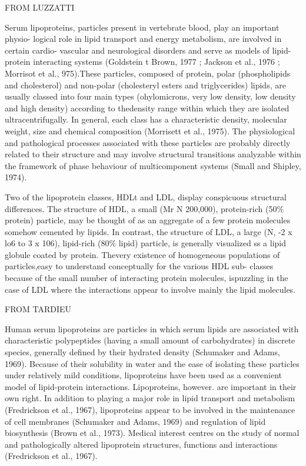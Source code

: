 FROM LUZZATTI

Serum  lipoproteins,  particles present in vertebrate blood, play an important physio- logical role in lipid transport and energy metabolism, are involved in certain cardio- vascular and neurological disorders and serve as models of lipid-protein interacting systems (Goldstein t Brown, 1977 ; Jackson et al., 1976 ; Morrisot et al., 975).These particles, composed of protein, polar (phospholipids and cholesterol) and non-polar (cholesteryl esters and triglycerides) lipids, are usually classed into four main types (ohylomicrons, very low density, low density and high density) according to thedensity range within which they are isolated ultracentrifugally. In general, each class has a characteristic density, molecular weight, size and chemical composition (Morrisett et al., 1975). The physiological and pathological processes associated with these particles are probably directly related to their structure and may involve structural transitions analyzable within the framework of phase behaviour of multicomponent systems (Small and Shipley, 1974). 

Two of the lipoprotein classes, HDLt and LDL, display conspicuous structural differences. The structure of HDL, a small (Mr N 200,000), protein-rich (50$\%$ protein) particle, may be thought of as an aggregate of a few protein molecules somehow cemented by lipids. In contrast, the structure of LDL, a large (N, -2 x lo6 to 3 x 106), lipid-rich (80$\%$ lipid) particle, is generally visualized ss a lipid globule coated by protein. Thevery existence of homogeneous populations of particles,easy to understand conceptually for the various HDL sub- classes because of the small number of interacting protein molecules, ispuzzling in the case of LDL where the interactions appear to involve mainly the lipid molecules. 

FROM TARDIEU

Human serum lipoproteins are particles in which serum lipids are associated with characteristic polypeptides (having a small amount of carbohydrates) in discrete species, 
generally   defined  by  their  hydrated  density   (Schumaker  and  Adams,  1969).  Because  of  their  solubility   in  water  and  the  ease  of  isolating  these  particles  under  relatively   mild  conditions,  lipoproteins  have  been  used  as  a  convenient  model  of  lipid-protein  interactions.  Lipoproteins,  however.  are important  in  their  own  right.  In  addition  to  playing  a  major  role  in  lipid  transport  and  metabolism  (Fredrickson  et  al.,  1967),  lipoproteins  appear  to  be  involved  in  the  maintenance  of  cell  membranes  (Schumaker  and  Adams,  1969)  and  regulation  of  lipid  biosynthesis  (Brown  et  al.,  1973).  Medical  interest  centres  on  the  study   of  normal  and  pathologically   altered  lipoprotein  structures,  functions  and  interactions  (Fredrickson  et  al.,  1967).  

